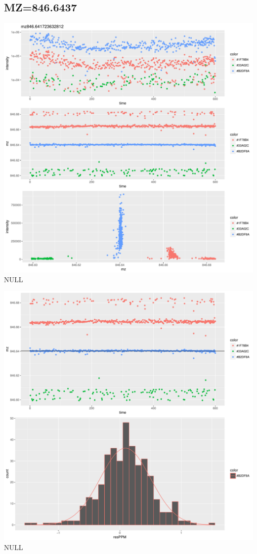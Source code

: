 \documentclass[]{article}
\begin{document}
\subsection{MZ=846.6437}\label{mz846.6437}

\includegraphics{Supplementary_document_files/figure-latex/cluster.mz.846-1.pdf}
NULL

\includegraphics{Supplementary_document_files/figure-latex/filter.lm.846-1.pdf}
NULL
\end{document}

